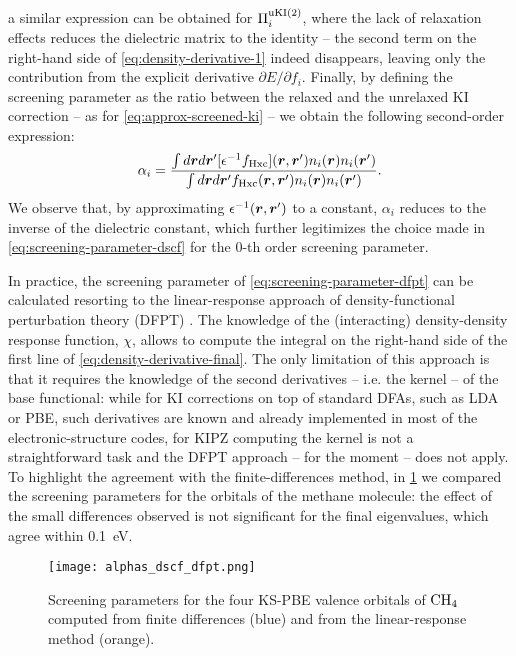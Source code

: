 %
a similar expression can be obtained for $\Pi_i^{\rm uKI(2)}$, where the lack of relaxation effects reduces the dielectric matrix to the identity -- the second term on the right-hand side of \cref{eq:density-derivative-1} indeed disappears, leaving only the contribution from the explicit derivative $\partial E / \partial f_i$. Finally, by defining the screening parameter as the ratio between the relaxed and the unrelaxed KI correction -- as for \cref{eq:approx-screened-ki} -- we obtain the following second-order expression:
%
\begin{equation}
    \alpha_i = \frac{\int d{\bm r} d{\bm r}' [\epsilon^{-1} f_{\rm Hxc}]({\bm r},{\bm r}') n_i({\bm r}) n_i({\bm r}')}{\int d{\bm r} d{\bm r}' f_{\rm Hxc}({\bm r},{\bm r}') n_i({\bm r}) n_i({\bm r}')} .
    \label{eq:screening-parameter-dfpt}
\end{equation}
%
We observe that, by approximating $\epsilon^{-1}({\bm r},{\bm r}')$ to a constant, $\alpha_i$ reduces to the inverse of the dielectric constant, which further legitimizes the choice made in \cref{eq:screening-parameter-dscf} for the 0-th order screening parameter.

In practice, the screening parameter of \cref{eq:screening-parameter-dfpt} can be calculated resorting to the linear-response approach of density-functional perturbation theory (DFPT) \cite{colonna_screening_2018}. The knowledge of the (interacting) density-density response function, $\chi$, allows to compute the integral on the right-hand side of the first line of \cref{eq:density-derivative-final}. The only limitation of this approach is that it requires the knowledge of the second derivatives -- i.e. the kernel -- of the base functional: while for KI corrections on top of standard DFAs, such as LDA or PBE, such derivatives are known and already implemented in most of the electronic-structure codes, for KIPZ computing the kernel is not a straightforward task and the DFPT approach -- for the moment -- does not apply. To highlight the agreement with the finite-differences method, in \cref{fig:alphas-dscf-dfpt} we compared the screening parameters for the orbitals of the methane molecule: the effect of the small differences observed is not significant for the final eigenvalues, which agree within 0.1~eV. 

\begin{figure}
    \centering
    \texttt{[image: alphas\_dscf\_dfpt.png]}
    \caption[Comparison of screening parameters from $\Delta$SCF and DFPT]{Screening parameters for the four KS-PBE valence orbitals of ${\rm CH}_4$ computed from finite differences (blue) and from the linear-response method (orange).}
    \label{fig:alphas-dscf-dfpt}
\end{figure}

